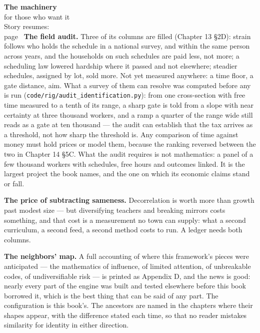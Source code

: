 \begin{machinery}{\textbf{The machinery}\\for those who want it\\[3pt]{\color{muted}Story resumes:\\page~\pageref{ch15-s5}}}
\textbf{The field audit.} Three of its columns are filled (Chapter 13 §2D):
strain follows who holds the schedule in a national survey, and
within the same person across years, and the households on such
schedules are paid less, not more; a scheduling law lowered hardship
where it passed and not elsewhere; steadier schedules, assigned by
lot, sold more. Not yet measured anywhere: a time floor, a gate
distance, aim. What a survey of them can resolve was computed before
any is run (\texttt{code/\allowbreak{}rig/\allowbreak{}audit\_\allowbreak{}identification.\allowbreak{}py}): from one
cross-section with free time measured to a tenth of its range, a sharp
gate is told from a slope with near certainty at three thousand
workers, and a ramp a quarter of the range wide still reads as a gate
at ten thousand --- the audit can establish that the tax arrives as a
threshold, not how sharp the threshold is. Any comparison of time
against money must hold prices or model them, because the ranking
reversed between the two in Chapter 14 §5C. What the audit requires is
not mathematics: a panel of a few thousand workers with schedules,
free hours and outcomes linked. It is the largest project the book
names, and the one on which its economic claims stand or fall.

\textbf{The price of subtracting sameness.} Decorrelation is worth more
than growth past modest size --- but diversifying teachers and breaking
mirrors costs something, and that cost is a measurement no town can
supply: what a second curriculum, a second feed, a second method costs
to run. A ledger needs both columns.

\textbf{The neighbors' map.} A full accounting of where this framework's
pieces were anticipated --- the mathematics of influence, of limited
attention, of unbreakable codes, of undiversifiable risk --- is printed
as Appendix D, and the news is good: nearly every part of the engine
was built and tested elsewhere before this book borrowed it, which is
the best thing that can be said of any part. The configuration is
this book's. The ancestors are named in the chapters where their shapes
appear, with the difference stated each time, so that no reader
mistakes similarity for identity in either direction.


\end{machinery}
